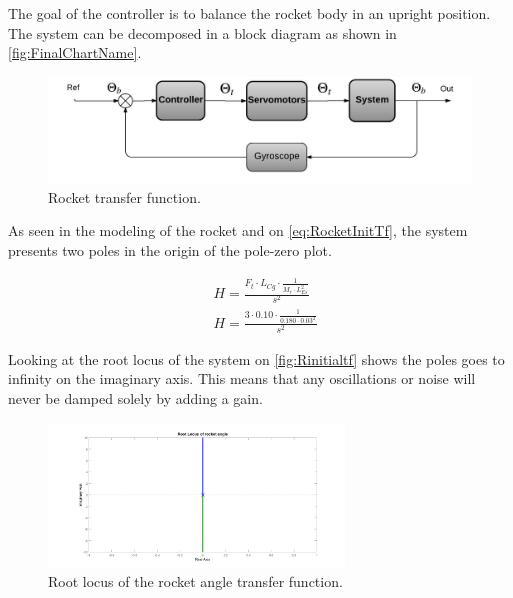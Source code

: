 \graphicspath{{figures/Rocket/design/}}

The goal of the controller is to balance the rocket body in an upright position. The system can be decomposed in a block diagram as shown in \autoref{fig:FinalChartName}.

\begin{figure}[htbp]
	\centering
	
	\includegraphics[width=\textwidth]{figures/Rocket/design/final_chart}
	\caption{Rocket transfer function.}
	\label{fig:FinalChartName}
	
\end{figure}

As seen in the modeling of the rocket and on \autoref{eq:RocketInitTf}, the system presents two poles in the origin of the pole-zero plot. 

\begin{subequations}
	\begin{flalign}
		& H = \frac{F_t \cdot L_{Cg} \cdot \frac{1}{M_r \cdot L_{Es}^2}}{s^2}	\label{eq:RocketInitTf} \\
		& H = \frac{3 \cdot 0.10 \cdot \frac{1}{0.180 \cdot 0.03^2}}{s^2}
	\end{flalign}
\end{subequations}
\startexplain
{}
\stopexplain

Looking at the root locus of the system on \autoref{fig:Rinitialtf} shows the poles goes to infinity on the imaginary axis. This means that any oscillations or noise will never be damped solely by adding a gain. 
\begin{figure}[htbp]
\centering
\includegraphics[width=0.7\textwidth]{figures/Rocket/design/initial_transfer_function_vf}
\caption{Root locus of the rocket angle transfer function.}
\label{fig:Rinitialtf}
\end{figure}

